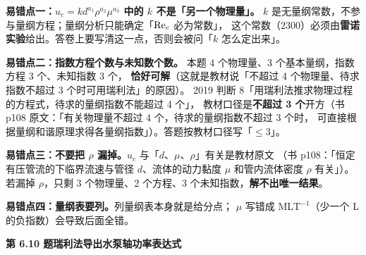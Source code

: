 \begin{yicuo}
\textbf{易错点一：$u_c=k d^{a_1}\rho^{a_2}\mu^{a_3}$ 中的 $k$ 不是「另一个物理量」。}
$k$ 是无量纲常数，不参与量纲方程；量纲分析只能确定「$\mathrm{Re}_c$ 必为常数」，
这个常数（$2300$）必须由\textbf{雷诺实验}给出。答卷上要写清这一点，否则会被问「$k$ 怎么定出来」。

\textbf{易错点二：指数方程个数与未知数个数。}
本题 4 个物理量、3 个基本量纲，指数方程 3 个、未知指数 3 个，
\textbf{恰好可解}（这就是教材说「不超过 4 个物理量、待求指数不超过 3 个时可用瑞利法」的原因）。
2019 判断 8「用瑞利法推求物理过程的方程式，待求的量纲指数不能超过 4 个」，
教材口径是\textbf{不超过 3 个}开方（书 p108 原文：「有关物理量不超过 4 个，待求的量纲指数不超过 3 个时，
可直接根据量纲和谐原理求得各量纲指数」）。答题按教材口径写「$\le3$」。

\textbf{易错点三：不要把 $\rho$ 漏掉。}$u_c$ 与「$d$、$\mu$、$\rho$」有关是教材原文
（书 p108：「恒定有压管流的下临界流速与管径 $d$、流体的动力黏度 $\mu$ 和管内流体密度 $\rho$ 有关」）。
若漏掉 $\rho$，只剩 3 个物理量、2 个方程、3 个未知指数，\textbf{解不出唯一结果}。

\textbf{易错点四：量纲表要列。}列量纲表本身就是给分点；
$\mu$ 写错成 $\mathrm{MLT^{-1}}$（少一个 $\mathrm{L}$ 的负指数）会导致后面全错。
\end{yicuo}

\noindent\textbf{第 6.10 题\quad 瑞利法导出水泵轴功率表达式}


